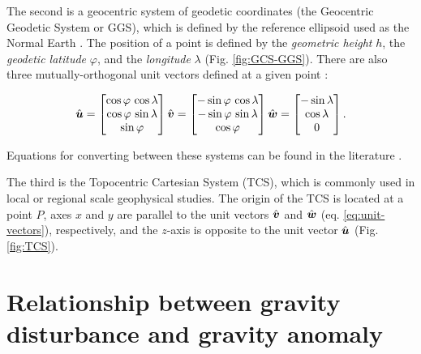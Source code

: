 \documentclass[extra]{gji}
\begin{document}
The second is a geocentric system of geodetic coordinates
(the Geocentric Geodetic System or GGS),
which is defined by the reference ellipsoid used as the Normal Earth
\citep{heiskanen-moritz1967, soler1976, torge2012, bouman_etal2013}.
The position of a point is defined by
the \textit{geometric height} $h$,
the \textit{geodetic latitude} $\varphi$,
and the \textit{longitude} $\lambda$ (Fig. \ref{fig:GCS-GGS}).
There are also three mutually-orthogonal unit vectors defined at a given point
\citep{soler1976}:

\begin{equation}
    \hat{\mitbf{u}} =
    \begin{bmatrix}
        \cos\varphi \, \cos\lambda \\
        \cos\varphi \, \sin\lambda \\
        \sin\varphi
    \end{bmatrix}
    \hat{\mitbf{v}} =
        \begin{bmatrix}
        -\sin\varphi \, \cos\lambda \\
        -\sin\varphi \, \sin\lambda \\
        \cos\varphi
    \end{bmatrix}
    \hat{\mitbf{w}} =
    \begin{bmatrix}
        -\sin\lambda \\
        \cos\lambda \\
        0
    \end{bmatrix} .
    \label{eq:unit-vectors}
\end{equation}

\noindent Equations for converting between these systems can be found in
the literature \citep[e.g.,][]{heiskanen-moritz1967, torge2012,
bouman_etal2013}.

The third is the Topocentric Cartesian System (TCS),
which is commonly used in local or regional scale geophysical studies.
The origin of the TCS is located at a point $P$,
axes $x$ and $y$ are parallel to
the unit vectors $\hat{\mitbf{v}}$ and $\hat{\mitbf{w}}$
(eq. \ref{eq:unit-vectors}), respectively,
and the $z$-axis is opposite to the unit vector $\hat{\mitbf{u}}$
(Fig. \ref{fig:TCS}).


\section{Relationship between gravity disturbance and gravity anomaly}
\end{document}
